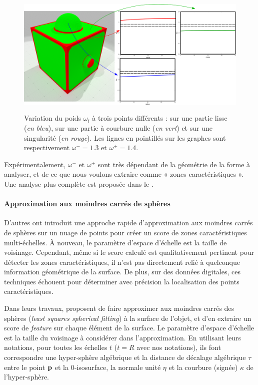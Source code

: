 \begin{figure}[ht]{
  \begin{center}
    \includegraphics[height=6cm]{figures/CubeSpherePlotTensor}
  \end{center}}
    \caption[Variation du poids $\omega_i$.]{Variation du poids $\omega_i$ à
    trois points différents : sur une partie lisse (\emph{en bleu}), sur une
    partie à courbure nulle (\emph{en vert}) et sur une singularité (\emph{en
    rouge}). Les lignes en pointillés sur les graphes sont respectivement
    $\omega^- = 1.3$ et $\omega^+ = 1.4$.\label{fig:tensor-cubesphere}}
\end{figure}


Expérimentalement, $\omega^-$ et $\omega^+$ sont très dépendant de la géométrie
de la forme à analyser, et de ce que nous voulons extraire comme « zones
caractéristiques ». Une analyse plus complète est proposée dans le
.
%
\paragraph{Approximation aux moindres carrés de sphères}%
\label{sec:applications:feature:growing}
%
D'autres \cite{Mellado2012} ont introduit une approche rapide d'approximation
aux moindres carrés de sphères sur un nuage de points pour créer un score de
zones caractéristiques multi-échelles. À nouveau, le paramètre d'espace d'échelle
est la taille de voisinage. Cependant, même si le score calculé est
qualitativement pertinent pour détecter les zones caractéristiques, il n'est pas
directement relié à quelconque information géométrique de la surface. De plus,
sur des données digitales, ces techniques échouent pour déterminer avec
précision la localisation des points caractéristiques.


Dans leurs travaux,  proposent de faire
approximer aux moindres carrés des sphères (\emph{least squares spherical
fitting}) à la surface de l'objet, et d'en extraire un score de \emph{feature}
sur chaque élément de la surface. Le paramètre d'espace d'échelle est la taille
du voisinage à considérer dans l'approximation. En utilisant leurs notations,
pour toutes les échelles $t$ ($t=R$ avec nos notations), ils font correspondre
une hyper-sphère algébrique et la distance de décalage algébrique $\tau$ entre
le point $\mathbf{p}$ et la $0$-isosurface, la normale unité $\eta$ et la courbure
(signée) $\kappa$ de l'hyper-sphère.

